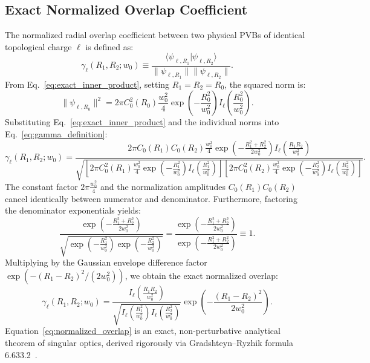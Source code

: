 \documentclass{optica-article}
\begin{document}
\subsection{Exact Normalized Overlap Coefficient}

The normalized radial overlap coefficient between two physical PVBs of identical topological charge $\ell$ is defined as:
\begin{equation}
\gamma_\ell(R_1, R_2; w_0) \equiv \frac{\langle \psi_{\ell, R_1} | \psi_{\ell, R_2} \rangle}{\|\psi_{\ell, R_1}\| \|\psi_{\ell, R_2}\|}.
\label{eq:gamma_definition}
\end{equation}
From Eq.~\eqref{eq:exact_inner_product}, setting $R_1 = R_2 = R_0$, the squared norm is:
\begin{equation}
\|\psi_{\ell, R_0}\|^2 = 2\pi C_0^2(R_0) \frac{w_0^2}{4} \exp\left( - \frac{R_0^2}{w_0^2} \right) I_\ell\left( \frac{R_0^2}{w_0^2} \right).
\label{eq:squared_norm_recap}
\end{equation}
Substituting Eq.~\eqref{eq:exact_inner_product} and the individual norms into Eq.~\eqref{eq:gamma_definition}:
\begin{equation}
\gamma_\ell(R_1, R_2; w_0) = \frac{2\pi C_0(R_1) C_0(R_2) \frac{w_0^2}{4} \exp\left( - \frac{R_1^2 + R_2^2}{2 w_0^2} \right) I_\ell\left( \frac{R_1 R_2}{w_0^2} \right)}{\sqrt{\left[ 2\pi C_0^2(R_1) \frac{w_0^2}{4} \exp\left( - \frac{R_1^2}{w_0^2} \right) I_\ell\left( \frac{R_1^2}{w_0^2} \right) \right] \left[ 2\pi C_0^2(R_2) \frac{w_0^2}{4} \exp\left( - \frac{R_2^2}{w_0^2} \right) I_\ell\left( \frac{R_2^2}{w_0^2} \right) \right]}}.
\label{eq:gamma_substitution}
\end{equation}
The constant factor $2\pi \frac{w_0^2}{4}$ and the normalization amplitudes $C_0(R_1) C_0(R_2)$ cancel identically between numerator and denominator. Furthermore, factoring the denominator exponentials yields:
\begin{equation}
\frac{\exp\left( - \frac{R_1^2 + R_2^2}{2 w_0^2} \right)}{\sqrt{\exp\left( - \frac{R_1^2}{w_0^2} \right) \exp\left( - \frac{R_2^2}{w_0^2} \right)}} = \frac{\exp\left( - \frac{R_1^2 + R_2^2}{2 w_0^2} \right)}{\exp\left( - \frac{R_1^2 + R_2^2}{2 w_0^2} \right)} \equiv 1.
\label{eq:exponential_cancellation}
\end{equation}
Multiplying by the Gaussian envelope difference factor $\exp(-(R_1-R_2)^2 / (2w_0^2))$, we obtain the exact normalized overlap:
\begin{equation}
\boxed{\gamma_\ell(R_1, R_2; w_0) = \frac{I_\ell\left( \frac{R_1 R_2}{w_0^2} \right)}{\sqrt{I_\ell\left( \frac{R_1^2}{w_0^2} \right) I_\ell\left( \frac{R_2^2}{w_0^2} \right)}} \exp\left( - \frac{(R_1 - R_2)^2}{2 w_0^2} \right).}
\label{eq:normalized_overlap}
\end{equation}
Equation~\eqref{eq:normalized_overlap} is an exact, non-perturbative analytical theorem of singular optics, derived rigorously via Gradshteyn--Ryzhik formula 6.633.2~\cite{Gradshteyn2014}.
\end{document}
